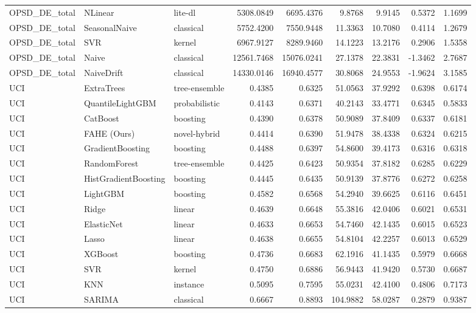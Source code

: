 \begin{tabular}{lllrrrrrr}
OPSD_DE_total & NLinear & lite-dl & 5308.0849 & 6695.4376 & 9.8768 & 9.9145 & 0.5372 & 1.1699 \\
OPSD_DE_total & SeasonalNaive & classical & 5752.4200 & 7550.9448 & 11.3363 & 10.7080 & 0.4114 & 1.2679 \\
OPSD_DE_total & SVR & kernel & 6967.9127 & 8289.9460 & 14.1223 & 13.2176 & 0.2906 & 1.5358 \\
OPSD_DE_total & Naive & classical & 12561.7468 & 15076.0241 & 27.1378 & 22.3831 & -1.3462 & 2.7687 \\
OPSD_DE_total & NaiveDrift & classical & 14330.0146 & 16940.4577 & 30.8068 & 24.9553 & -1.9624 & 3.1585 \\
UCI & ExtraTrees & tree-ensemble & 0.4385 & 0.6325 & 51.0563 & 37.9292 & 0.6398 & 0.6174 \\
UCI & QuantileLightGBM & probabilistic & 0.4143 & 0.6371 & 40.2143 & 33.4771 & 0.6345 & 0.5833 \\
UCI & CatBoost & boosting & 0.4390 & 0.6378 & 50.9089 & 37.8409 & 0.6337 & 0.6181 \\
UCI & FAHE (Ours) & novel-hybrid & 0.4414 & 0.6390 & 51.9478 & 38.4338 & 0.6324 & 0.6215 \\
UCI & GradientBoosting & boosting & 0.4488 & 0.6397 & 54.8600 & 39.4173 & 0.6316 & 0.6318 \\
UCI & RandomForest & tree-ensemble & 0.4425 & 0.6423 & 50.9354 & 37.8182 & 0.6285 & 0.6229 \\
UCI & HistGradientBoosting & boosting & 0.4445 & 0.6435 & 50.9139 & 37.8776 & 0.6272 & 0.6258 \\
UCI & LightGBM & boosting & 0.4582 & 0.6568 & 54.2940 & 39.6625 & 0.6116 & 0.6451 \\
UCI & Ridge & linear & 0.4639 & 0.6648 & 55.3816 & 42.0406 & 0.6021 & 0.6531 \\
UCI & ElasticNet & linear & 0.4633 & 0.6653 & 54.7460 & 42.1435 & 0.6015 & 0.6523 \\
UCI & Lasso & linear & 0.4638 & 0.6655 & 54.8104 & 42.2257 & 0.6013 & 0.6529 \\
UCI & XGBoost & boosting & 0.4736 & 0.6683 & 62.1916 & 41.1435 & 0.5979 & 0.6668 \\
UCI & SVR & kernel & 0.4750 & 0.6886 & 56.9443 & 41.9420 & 0.5730 & 0.6687 \\
UCI & KNN & instance & 0.5095 & 0.7595 & 55.0231 & 42.4100 & 0.4806 & 0.7173 \\
UCI & SARIMA & classical & 0.6667 & 0.8893 & 104.9882 & 58.0287 & 0.2879 & 0.9387 \\

\end{tabular}
